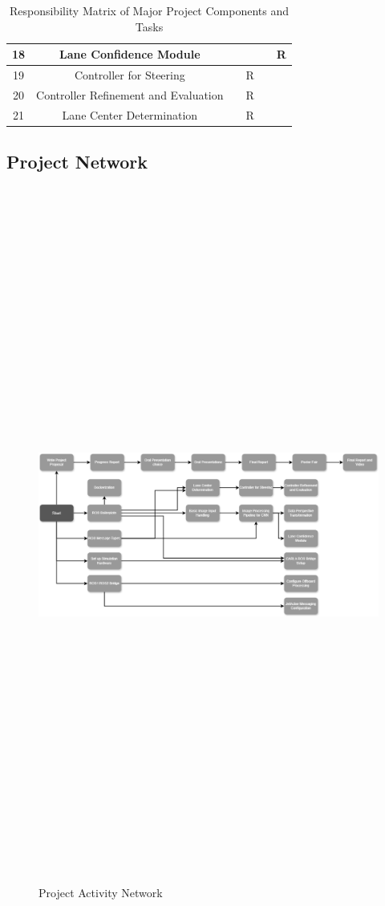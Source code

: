 \documentclass[titlepage,draft]{article}
\begin{document}
\begin{table}[H]
\begin{tabular}{|c | c | c | c | c | c |}
		\hline
		18   & Lane Confidence Module               &        &      &     & R      \\
		\hline
		19   & Controller for Steering              &        & R    &     &        \\
		\hline
		20   & Controller Refinement and Evaluation &        & R    &     &        \\
		\hline
		21   & Lane Center Determination            &        & R    &     &        \\
		\hline
	\end{tabular}
	\caption{Responsibility Matrix of Major Project Components and Tasks}
	\label{tab:WorkBreakdown}
\end{table}

\subsection{Project Network}

\begin{figure}[H]
	\centering
	\includegraphics[angle=90,height=9in]{activity}
	\caption{Project Activity Network}
	\label{fig:activity}
\end{figure}
\end{document}
